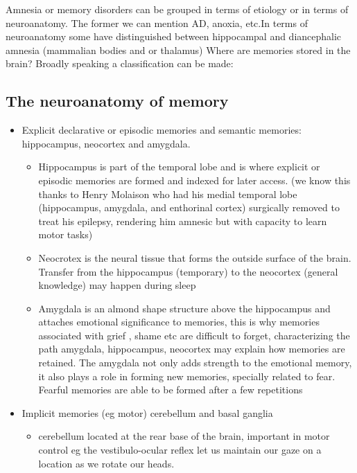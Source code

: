 \documentclass[9pt,twocolumn,twoside]{pnas-new}
\begin{document}
Amnesia or memory disorders can be grouped in terms of etiology or in terms of neuroanatomy. The former we can mention AD, anoxia, etc.In terms of neuroanatomy some have distinguished between hippocampal and diancephalic amnesia (mammalian bodies and or thalamus)
Where are memories stored in the brain? Broadly speaking a classification can be made:

\subsection*{The neuroanatomy of memory}



\begin{itemize}
\item Explicit declarative or episodic memories and semantic memories: hippocampus, neocortex and amygdala.
\begin{itemize}
	\item Hippocampus is part of the temporal lobe and is where explicit or episodic memories are formed and indexed for later access. (we know this thanks to Henry Molaison who had his medial temporal lobe (hippocampus, amygdala, and enthorinal cortex) surgically removed to treat his epilepsy, rendering him amnesic but with capacity to learn motor tasks)
	\item Neocrotex is the neural tissue that forms the outside surface of the brain. Transfer from the hippocampus (temporary) to the neocortex (general knowledge) may happen during sleep
	\item Amygdala is an almond shape structure above the hippocampus and attaches emotional significance to memories, this is why memories associated with grief , shame etc are difficult to forget, characterizing the path amygdala, hippocampus, neocortex may explain how memories are retained. The amygdala not only adds strength to the emotional memory, it also plays a role in forming new memories, specially related to fear. Fearful memories are able to be formed after a few repetitions
\end{itemize} 
\item Implicit memories (eg motor) cerebellum and basal ganglia
	\begin{itemize}
		\item cerebellum located at the rear base of the brain, important in motor control eg the vestibulo-ocular reflex let us maintain our gaze on a location as we rotate our heads.

\end{itemize}
\end{itemize}
\end{document}
